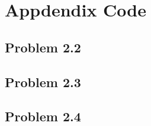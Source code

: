 \section*{Appdendix Code}

\subsection*{Problem 2.2}



\subsection*{Problem 2.3}



\subsection*{Problem 2.4}




